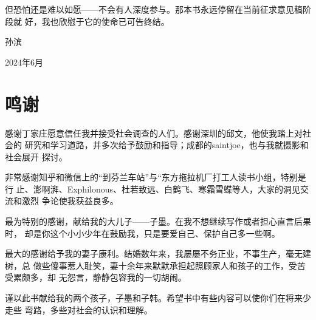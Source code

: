 但恐怕还是难以如愿——不会有人深度参与。那本书永远停留在当前征求意见稿阶段就
好，我也欣慰于它的使命已可告终结。

{\raggedleft

孙滨 \qquad\qquad \par

2024年6月 \quad}

\chapter{鸣谢}

感谢丁家庄愿意信任我并接受社会调查的人们。感谢深圳的邱文，他使我踏上对社会的
研究和学习道路，并多次给予鼓励和指导；成都的saintjoe，也与我就摄影和社会展开
探讨。

非常感谢知乎和微信上的“到芬兰车站”与“东方拖拉机厂打工人读书小组，特别是行
止、澎啊湃、Exphilonous、杜若致远、白鹤飞、寒霜雪蝶等人，大家的洞见交流和激烈
争论使我获益良多。


最为特别的感谢，献给我的大儿子——子墨。在我不想继续写作或者担心直言后果时，
却是你这个小小少年在鼓励我，只是要爱自己、保护自己多一些啊。

最大的感谢给予我的妻子康利。结婚数年来，我屡屡不务正业，不事生产，毫无建树，总
做些傻事惹人耻笑，妻十余年来默默承担起照顾家人和孩子的工作，受苦受累颇多，却
无怨言，静静包容我的一切胡闹。

谨以此书献给我的两个孩子，子墨和子韩。希望书中有些内容可以使你们在将来少走些
弯路，多些对社会的认识和理解。






